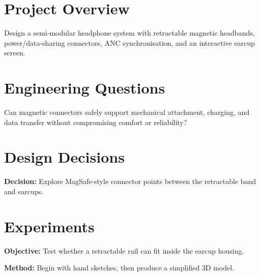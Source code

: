 \documentclass{otengineering}
\begin{document}
\makeotengtitle%

\section{Project Overview}

\begin{idea}
    Design a semi-modular headphone system with retractable magnetic headbands,
    power/data-sharing connectors, ANC synchronisation, and an interactive earcup screen.
\end{idea}

\section{Engineering Questions}

\begin{questionbox}
    Can magnetic connectors safely support mechanical attachment, charging, and data transfer
    without compromising comfort or reliability?
\end{questionbox}

\section{Design Decisions}

\begin{decision}
    \entrydate{\today}
    \textbf{Decision:} Explore MagSafe-style connector points between the retractable band and earcups.


\end{decision}

\section{Experiments}

\begin{experiment}
    \entrydate{\today}
    \textbf{Objective:} Test whether a retractable rail can fit inside the earcup housing.

    \textbf{Method:} Begin with hand sketches, then produce a simplified 3D model.

\end{experiment}
\end{document}
